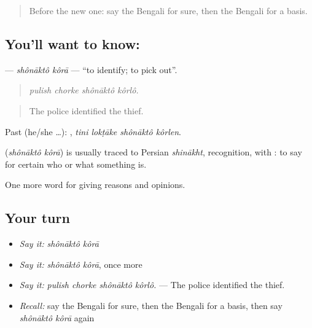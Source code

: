 \begin{quote}
Before the new one: say the Bengali for sure, then the Bengali for a basis.
\end{quote}

\subsection*{You'll want to know:  }
\textbf{ } — \emph{shônāktô kôrā} — \textquotedblleft{}to identify; to pick out\textquotedblright{}.

\begin{quote}
   
\end{quote}

\begin{quote}
\emph{pulish chorke shônāktô kôrlô.}
\end{quote}

\begin{quote}
The police identified the thief.
\end{quote}

Past (he/she …):    , \emph{tini lokṭāke shônāktô kôrlen}.

\begin{cousinweb}
\textbf{ } (\emph{shônāktô kôrā}) is usually traced to Persian \emph{shinākht}, recognition, with : to say for certain who or what something is.
\end{cousinweb}

\begin{grammarlens}[title={What you've built}]
One more word for giving reasons and opinions.
\end{grammarlens}

\subsection*{Your turn}
\begin{itemize}
\raggedright
  \item \emph{Say it:} \emph{shônāktô kôrā}
  \item \emph{Say it:} \emph{shônāktô kôrā}, once more
  \item \emph{Say it:} \emph{pulish chorke shônāktô kôrlô.} — The police identified the thief.
  \item \emph{Recall:} say the Bengali for sure, then the Bengali for a basis, then say \emph{shônāktô kôrā} again
\end{itemize}


